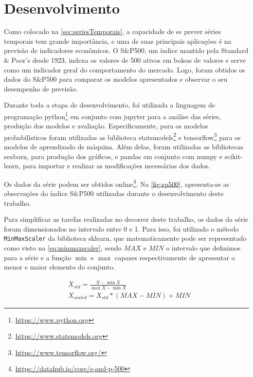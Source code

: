 \documentclass[
    12pt,
    oneside,
    a4paper,
    english,
    brazil
]{abntex2}
\begin{document}
\chapter{Desenvolvimento}\label{chap:desenv}

Como colocado na \autoref{sec:seriesTemporais}, a capacidade de se prever séries
temporais tem  grande importância,  e uma  de suas  principais aplicações  é na
previsão de indicadores econômicos. O  S\&P500, um índice mantido pela Standard
\& Poor's desde  1923, indexa os valores  de 500 ativos em bolsas  de valores e
serve como um  indicador geral do comportamento do mercado.  Logo, foram obtidos
os dados  do S\&P500  para comparar  os modelos apresentados  e observar  o seu
desempenho de previsão.

Durante   toda  a   etapa  de   desenvolvimento,  foi  utilizada  a   linguagem
de   programação   python\footnote{\url{https://www.python.org}}  em   conjunto
com   jupyter   para  a   análise   das   séries,   produção  dos   modelos   e
avaliação.  Especificamente, para  os  modelos  probabilísticos  foram  utilizadas
as    biblioteca    statsmodels\footnote{\url{https://www.statsmodels.org}}    e
tensorflow\footnote{\url{https://www.tensorflow.org/}}   para  os   modelos  de
aprendizado de máquina.  Além delas, foram utilizadas as  bibliotecas seaborn, para
produção  dos gráficos,  e  pandas em  conjunto com  numpy  e scikit-learn,  para
importar e realizar as modificações necessárias dos dados.

Os           dados            da           série            podem           ser
obtidos      online\footnote{\url{https://datahub.io/core/s-and-p-500}}.     Na
\autoref{fig:sp500}, apresenta-se  as observações  do índice  S\&P500 utilizadas
durante  o   desenvolvimento  deste  trabalho.

Para simplificar as tarefas realizadas no  decorrer deste trabalho, os dados da
série foram dimensionados no  intervalo entre 0 e 1. Para  isso, foi utilizado o
método \texttt{MinMaxScaler}  da biblioteca  sklearn, que  matematicamente pode
ser representado como visto na \autoref{eq:minmaxscaler}, sendo $MAX$ e $MIN$ o
intervalo  que definimos  para  a série  e  a função  $\min$  e $\max$  capazes
respectivamente de apresentar o menor e maior elemento do conjunto.

\begin{equation}
    \begin{split}\label{eq:minmaxscaler}
        &X_{std} = \frac{X - \min X}{\max X-\min X}\\
        &X_{scaled} = X_{std} * (MAX-MIN)+MIN
    \end{split}
\end{equation}
\end{document}
